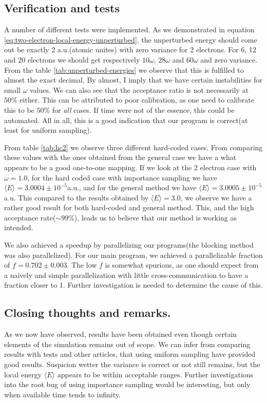 \documentclass[11pt]{article}
\begin{document}
\subsection{Verification and tests}
A number of different tests were implemented. As we demonstrated in equation \eqref{eq:two-electron-local-energy-unperturbed}, the unperturbed energy should come out be exactly 2 a.u.(atomic unites) with zero variance for 2 electrons. For 6, 12 and 20 electrons we should get respectively $10\omega$, $28\omega$ and $60\omega$ and zero variance. From the table \ref{tab:unperturbed-energies} we observe that this is fulfilled to almost the exact decimal. By almost, I imply that we have certain instabilities for small $\omega$ values. We can also see that the acceptance ratio is not necessarily at $50\%$ either. This can be attributed to poor calibration, as one need to calibrate this to be $50\%$ for \textit{all} cases. If time were not of the essence, this could be automated. All in all, this is a good indication that our program is correct(at least for uniform sampling).

From table \ref{tab:hc2} we observe three different hard-coded cases. From comparing these values with the ones obtained from the general case we have a what appears to be a good one-to-one mapping. If we look at the 2 electron case with $\omega=1.0$, for the hard coded case with importance sampling we have $\langle E\rangle=3.0004\pm10^{-5}$a.u., and for the general method we have $\langle E\rangle=3.0005\pm10^{-5}$a.u. This compared to the results obtained by \citet{PhysRevB.84.115302} $\langle E \rangle = 3.0$, we observe we have a rather good result for both hard-coded and general method. This, and the high acceptance rate($\sim 99\%$), leads us to believe that our method is working as intended.

We also achieved a speedup by parallelizing our programs(the blocking method was also parallelized). For our main program, we achieved a parallelizable fraction of $f=0.702\pm 0.003$. The low $f$ is somewhat spurious, as one should expect from a naively and simple parallelization with little cross-communication to have a fraction closer to 1. Further investigation is needed to determine the cause of this.

\subsection{Closing thoughts and remarks.}
As we now have observed, results have been obtained even though certain elements of the simulation remains out of scope. We can infer from comparing results with tests and other articles\cite{PhysRevB.84.115302}, that using uniform sampling have provided good results. Suspicion wetter the variance is correct or not still remains, but the local energy $\langle E\rangle$ appears to be within acceptable ranges. Further investigations into the root bug of using importance sampling would be interesting, but only when available time tends to infinity.
\end{document}

